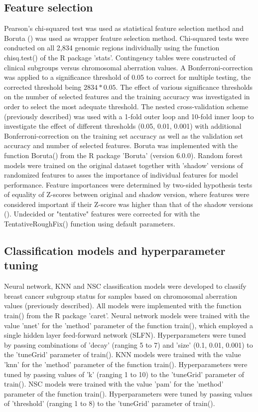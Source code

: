 \subsection{Feature selection}
    Pearson's chi-squared test was used as statistical feature selection method and Boruta (\citealp{Kursa2010}) was used as wrapper feature selection method.
    Chi-squared tests were conducted on all 2,834 genomic regions individually using the function chisq.test() of the R package 'stats'. Contingency tables were constructed of clinical subgroups versus chromosomal aberration values. A Bonferroni-correction was applied to a significance threshold of 0.05 to correct for multiple testing, the corrected threshold being $2834 * 0.05$. The effect of various significance thresholds on the number of selected features and the training accuracy was investigated in order to select the most adequate threshold. The nested cross-validation scheme (previously described) was used with a 1-fold outer loop and 10-fold inner loop to investigate the effect of different thresholds (0.05, 0.01, 0.001) with additional Bonferroni-correction on the training set accuracy as well as the validation set accuracy and number of selected features.
    Boruta was implemented with the function Boruta() from the R package 'Boruta' (version 6.0.0). Random forest models were trained on the original dataset together with 'shadow' versions of randomized features to asses the importance of individual features for model performance. Feature importances were determined by two-sided hypothesis tests of equality of Z-scores between original and shadow version, where features were considered important if their Z-score was higher than that of the shadow versions  (\citealp{Kursa2010,kursa2014}). Undecided or "tentative" features were corrected for with the TentativeRoughFix() function using default parameters.

\subsection{Classification models and hyperparameter tuning}
    Neural network, KNN and NSC classification models were developed to classify breast cancer subgroup status for samples based on chromosomal aberration values (previously described). All models were implemented with the function train() from the R package 'caret'.
    Neural network models were trained with the value 'nnet' for the 'method' parameter of the function train(), which employed a single hidden layer feed-forward network (SLFN). Hyperparameters were tuned by passing combinations of 'decay' (ranging 5 to 7) and 'size' (0.1, 0.01, 0.001) to the 'tuneGrid' parameter of train().
    KNN models were trained with the value 'knn' for the 'method' parameter of the function train(). Hyperparameters were tuned by passing values of 'k' (ranging 1 to 10) to the 'tuneGrid' parameter of train().
    NSC models were trained with the value 'pam' for the 'method' parameter of the function train(). Hyperparameters were tuned by passing values of 'threshold' (ranging 1 to 8) to the 'tuneGrid' parameter of train().


